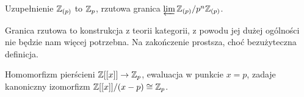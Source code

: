 \begin{fakt}
	Uzupełnienie $\mathbb Z_{(p)}$ to $\mathbb Z_p$, rzutowa granica $\varprojlim \mathbb Z_{(p)} / p^n\mathbb Z_{(p)}$.
\end{fakt}

Granica rzutowa to konstrukcja z teorii kategorii, z powodu jej dużej ogólności nie będzie nam więcej potrzebna.
Na zakończenie prostsza, choć bezużyteczna definicja.

\begin{fakt}
	Homomorfizm  pierścieni $\mathbb Z[[x]] \to \mathbb Z_p$, ewaluacja w punkcie $x = p$, zadaje kanoniczny izomorfizm $\mathbb Z[[x]] / (x-p) \cong \mathbb Z_p$.
\end{fakt}
